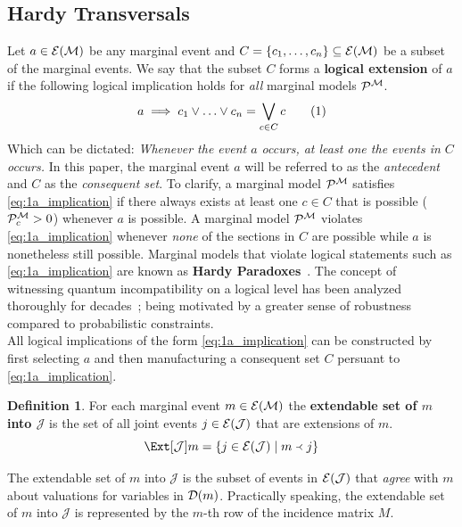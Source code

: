 \documentclass[aps, 10pt, english, twoside, pra, nofootinbib, longbibliography]{revtex4-1}
\theoremstyle{plain}
\theoremstyle{definition}
\newtheorem{definition}[theorem]{Definition}
\theoremstyle{remark}
\newcommand{\ext}{\mathrel{\Yleft}}
\newcommand{\mscenario}{\mathcal{M}}
\newcommand{\jointvar}{\mathcal{J}}
\newcommand{\term}[1]{\textcolor{Mahogany}{\textbf{#1}}}
\newcommand{\Events}[1]{\s{E}\br{#1}} %
\newcommand{\Dom}[1]{\s{D}\br{#1}} %
\begin{document}
    \subsection{Hardy Transversals}
    \label{sec:logical_inequalities}
    Let $a \in \Events{\mscenario}$ be any marginal event and $C = \bc{c_1, \ldots, c_{n}} \subseteq \Events{\mscenario}$ be a subset of the marginal events. We say that the subset $C$ forms a \term{logical extension} of $a$ if the following logical implication holds for \textit{all} marginal models $\probvec^{\mscenario}$.
    \[ a \implies c_1 \vee \ldots \vee c_n = \bigvee_{c \in C} c \eq \label{eq:1a_implication} \]
    Which can be dictated: \textit{Whenever the event $a$ occurs, at least one the events in $C$ occurs.} In this paper, the marginal event $a$ will be referred to as the \textit{antecedent} and $C$ as the \textit{consequent set}. To clarify, a marginal model $\probvec^{\mscenario}$ satisfies \cref{eq:1a_implication} if there always exists at least one $c \in C$ that is possible ($\probvec^{\mscenario}_c > 0$) whenever $a$ is possible. A marginal model $\probvec^{\mscenario}$ violates \cref{eq:1a_implication} whenever \textit{none} of the sections in $C$ are possible while $a$ is nonetheless still possible. Marginal models that violate logical statements such as \cref{eq:1a_implication} are known as \term{Hardy Paradoxes}~\cite{Inflation,Mansfield_2012,Mancinska_2014}. The concept of witnessing quantum incompatibility on a logical level has been analyzed thoroughly for decades~\cite{Greenberger_1990,Abramsky_2012}; being motivated by a greater sense of robustness compared to probabilistic constraints. \\

    All logical implications of the form \cref{eq:1a_implication} can be constructed by first selecting $a$ and then manufacturing a consequent set $C$ persuant to \cref{eq:1a_implication}.

    \begin{definition}
        \label{def:extendable_set}
        For each marginal event $m \in \Events{\mscenario}$ the \term{extendable set of $m$ into $\jointvar$} is the set of all joint events $j \in \Events{\jointvar}$ that are extensions of $m$.
        \[ \Ext[\jointvar]{m} = \bc{j \in \Events{\jointvar} \mid m \ext j} \]
    \end{definition}

    The extendable set of $m$ into $\jointvar$ is the subset of events in $\Events{\jointvar}$ that \textit{agree} with $m$ about valuations for variables in $\Dom{m}$. Practically speaking, the extendable set of $m$ into $\jointvar$ is represented by the $m$-th row of the incidence matrix $M$.
\end{document}
